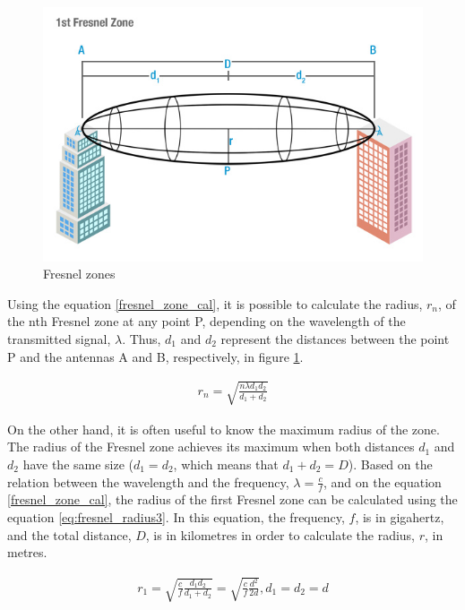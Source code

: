 \begin{figure}[H]
	\centering
	\includegraphics[scale=0.70]{figures/fresnel_zone.jpg}
	\caption{Fresnel zones}
	\label{fig:fresnel_zones}
\end{figure} 

Using the equation \ref{fresnel_zone_cal}, it is possible to calculate the radius, $r_n$, of the nth Fresnel zone at any point P, depending on the wavelength of the transmitted signal, $\lambda$. Thus, $d_1$ and $d_2$ represent the distances between the point P and the antennas A and B, respectively, in figure \ref{fig:fresnel_zones}.

\begin{align}
r_n = \sqrt{\frac{n \lambda d_1 d_2}{d_1+d_2}} \label{fresnel_zone_cal}
\end{align}

On the other hand, it is often useful to know the maximum radius of the zone. The radius of the Fresnel zone achieves its maximum when both distances $d_1$ and $d_2$ have the same size ($d_1=d_2$, which means that $d_1+d_2=D$). Based on the relation between the wavelength and the frequency, $\lambda = \frac{c}{f}$, and on the equation \ref{fresnel_zone_cal}, the radius of the first Fresnel zone can be calculated using the equation \ref{eq:fresnel_radius3}. In this equation, the frequency, $f$, is in gigahertz, and the total distance, $D$, is in kilometres in order to calculate the radius, $r$, in metres.

\begin{align}
r_1 = \sqrt{\frac{c}{f}\frac{d_1 d_2}{d_1+d_2}} = \sqrt{\frac{c}{f}\frac{d^2}{2d}}, d_1=d_2=d \label{eq:fresnel_radius1}
\end{align}

